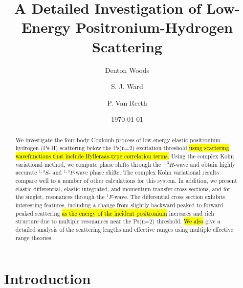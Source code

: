 \documentclass[preprint,showpacs,showkeys,preprintnumbers,amsmath,amssymb,longbibliography,pra,aps]{revtex4-1}
\begin{document}

\title{A Detailed Investigation of Low-Energy Positronium-Hydrogen Scattering}

\author{Denton Woods}

\author{S. J. Ward}

\author{P. Van Reeth}

\date{\today}

\begin{abstract}
We investigate the four-body Coulomb process of low-energy elastic
positronium-hydrogen (Ps-H) scattering below the Ps(n=2) excitation threshold
\hl{using scattering wavefunctions that include Hylleraas-type 
correlation terms.} Using the complex Kohn variational method, we 
compute phase shifts through the $^{1,3}H$-wave and obtain highly accurate
$^{1,3}S$- and $^{1,3}P$-wave phase shifts. The complex
Kohn variational results compare well to a number of other calculations for 
this system. In addition, we present elastic 
differential, elastic integrated, and momentum transfer
cross sections, and for the singlet, resonances through the
$^1F$-wave. The differential cross section exhibits interesting features,
including a change from slightly backward peaked to
forward peaked scattering \hl{as the energy of the incident
positronium} increases and
rich structure due to multiple resonances near the Ps(n=2) threshold.
\hl{We also} give a detailed analysis of the scattering lengths
and effective ranges using multiple effective range theories.
\end{abstract}

   
\maketitle

\section{\label{sec:Intro}\protect Introduction}


\end{document}
